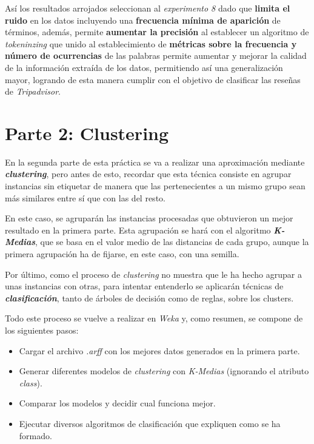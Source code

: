 \documentclass[12pt,a4paper, xcolor=table]{article}
\begin{document}
    \vspace{3mm}
    
    Así los resultados arrojados seleccionan al \textit{experimento 8} dado que \textbf{limita el ruido} en los datos incluyendo una\textbf{ frecuencia mínima de aparición} de términos, además, permite \textbf{aumentar la precisión} al establecer un algoritmo de \textit{tokeninzing} que unido al establecimiento de \textbf{métricas sobre la frecuencia y número de ocurrencias} de las palabras permite aumentar y mejorar la calidad de la información extraída de los datos, permitiendo así una generalización mayor, logrando de esta manera cumplir con el objetivo de clasificar las reseñas de \textit{Tripadvisor}.

\newpage

\section{Parte 2: Clustering}

En la segunda parte de esta práctica se va a realizar una aproximación mediante \textbf{\textit{clustering}}, pero antes de esto, recordar que esta técnica consiste en agrupar instancias sin etiquetar de manera que las pertenecientes a un mismo grupo sean más similares entre sí que con las del resto. 

\vspace{2mm}

En este caso, se agruparán las instancias procesadas que obtuvieron un mejor resultado en la primera parte. Esta agrupación se hará con el algoritmo \textbf{\textit{K-Medias}}, que se basa en el valor medio de las distancias de cada grupo, aunque la primera agrupación ha de fijarse, en este caso, con una semilla. 

\vspace{2mm}

Por último, como el proceso de \textit{clustering} no muestra que le ha hecho agrupar a unas instancias con otras, para intentar entenderlo se aplicarán técnicas de \textit{\textbf{clasificación}}, tanto de árboles de decisión como de reglas, sobre los clusters.

\vspace{2mm}

Todo este proceso se vuelve a realizar en \textit{Weka} y, como resumen, se compone de los siguientes pasos:

\vspace{1mm}

\begin{itemize}
    \item Cargar el archivo \textit{.arff} con los mejores datos generados en la primera parte.
    \item Generar diferentes modelos de \textit{clustering} con \textit{K-Medias} (ignorando el atributo \textit{class}).
    \item Comparar los modelos y decidir cual funciona mejor.
    \item Ejecutar diversos algoritmos de clasificación que expliquen como se ha formado.
\end{itemize}
\end{document}
